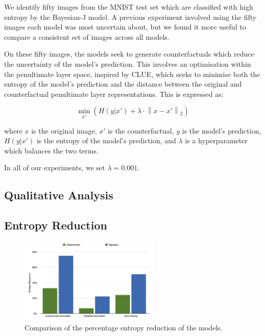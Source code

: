 \documentclass{article}
\begin{document}
We identify fifty images from the MNIST test set which are classified with high entropy by the Bayesian-J model. A previous experiment involved using the fifty images each model was most uncertain about, but we found it more useful to compare a consistent set of images across all models.

On these fifty images, the models seek to generate counterfactuals which reduce the uncertainty of the model's prediction. This involves an optimisation within the penultimate layer space, inspired by CLUE\citep{clue}, which seeks to minimise both the entropy of the model's prediction and the distance between the original and counterfactual penultimate layer representations. This is expressed as:

\begin{equation}
    \min_{x'} \left( H(y|x') + \lambda \cdot \left\| x - x' \right\|_2 \right)
\end{equation}

where $x$ is the original image, $x'$ is the counterfactual, $y$ is the model's prediction, $H(y|x')$ is the entropy of the model's prediction, and $\lambda$ is a hyperparameter which balances the two terms.

In all of our experiments, we set $\lambda = 0.001$. 

\subsection{Qualitative Analysis}

\subsection{Entropy Reduction}

\begin{figure}[H]
    \centering
    \includegraphics[width=0.6\textwidth]{figures/CLUE/EntropyReduction_Comparison.png}
    \caption{Comparison of the percentage entropy reduction of the models.}
    \label{fig:entropy_reduction}
\end{figure}
\end{document}
